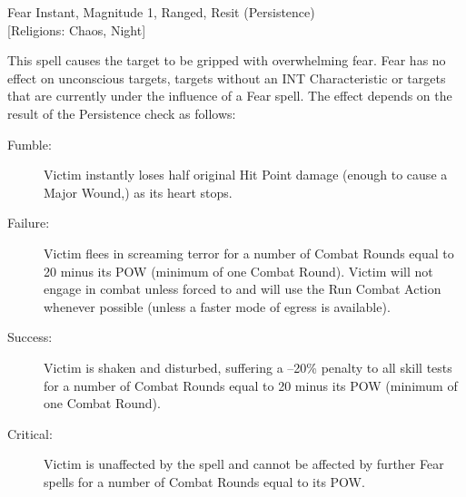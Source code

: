 \begin{samepage}
\begin{rpg-spell}
{Fear}
{Instant, Magnitude 1, Ranged, Resit (Persistence)\\{[Religions: Chaos, Night]}}

This spell causes the target to be gripped with overwhelming fear. Fear has no effect on unconscious targets, targets without an INT Characteristic or targets that are currently under the influence of a Fear spell. The effect depends on the result of the Persistence check as follows:
\begin{description}
\item[Fumble:] Victim instantly loses half original Hit Point damage (enough to cause a Major Wound,) as its heart stops. 
\item[Failure:] Victim flees in screaming terror for a number of Combat Rounds equal to 20 minus its POW (minimum of one Combat Round). Victim will not engage in combat unless forced to and will use the Run Combat Action whenever possible (unless a faster mode of egress is available). 
\item[Success:] Victim is shaken and disturbed, suffering a –20\% penalty to all skill tests for a number of Combat Rounds equal to 20 minus its POW (minimum of one Combat Round).
\item[Critical:] Victim is unaffected by the spell and cannot be affected by further Fear spells for a number of Combat Rounds equal to its POW.
\end{description}
\end{rpg-spell}
\end{samepage}

